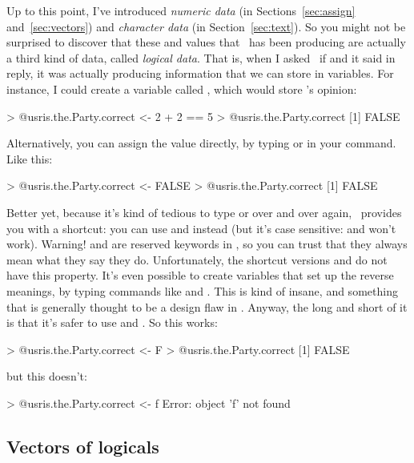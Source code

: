 Up to this point, I've introduced {\it numeric data} (in Sections~\ref{sec:assign} and~\ref{sec:vectors}) and {\it character data} (in Section~\ref{sec:text}). So you might not be surprised to discover that these  and  values that \R\ has been producing are actually a third kind of data, called {\it logical data}. That is, when I asked \R\ if  and it said  in reply, it was actually producing information that we can store in variables. For instance, I could create a variable called , which would store \R's opinion:
\begin{rblock1}
> @usr{is.the.Party.correct <- 2 + 2 == 5}
> @usr{is.the.Party.correct}
[1] FALSE
\end{rblock1}
Alternatively, you can assign the value directly, by typing  or  in your command. Like this:
\begin{rblock1}
> @usr{is.the.Party.correct <- FALSE}
> @usr{is.the.Party.correct}
[1] FALSE
\end{rblock1}
Better yet, because it's kind of tedious to type  or  over and over again, \R\ provides you with a shortcut: you can use  and  instead (but it's case sensitive:  and  won't work). 
Warning!  and  are reserved keywords in \R, so you can trust that they always mean what they say they do. Unfortunately, the shortcut versions  and  do not have this property. It's even possible to create variables that set up the reverse meanings, by typing commands like  and . This is kind of insane, and something that is generally thought to be a design flaw in \R. Anyway, the long and short of it is that it's safer to use  and .
So this works:
\begin{rblock1}
> @usr{is.the.Party.correct <- F}
> @usr{is.the.Party.correct}
[1] FALSE
\end{rblock1}
but this doesn't:
\begin{rblock1}
> @usr{is.the.Party.correct <- f}
Error: object 'f' not found
\end{rblock1}

\subsection{Vectors of logicals}

